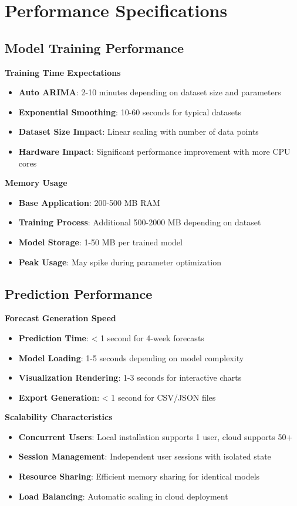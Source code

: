 \section{Performance Specifications}

\subsection{Model Training Performance}

\textbf{Training Time Expectations}
\begin{itemize}
	\item \textbf{Auto ARIMA}: 2-10 minutes depending on dataset size and parameters
	\item \textbf{Exponential Smoothing}: 10-60 seconds for typical datasets
	\item \textbf{Dataset Size Impact}: Linear scaling with number of data points
	\item \textbf{Hardware Impact}: Significant performance improvement with more CPU cores
\end{itemize}

\textbf{Memory Usage}
\begin{itemize}
	\item \textbf{Base Application}: 200-500 MB RAM
	\item \textbf{Training Process}: Additional 500-2000 MB depending on dataset
	\item \textbf{Model Storage}: 1-50 MB per trained model
	\item \textbf{Peak Usage}: May spike during parameter optimization
\end{itemize}

\subsection{Prediction Performance}

\textbf{Forecast Generation Speed}
\begin{itemize}
	\item \textbf{Prediction Time}: < 1 second for 4-week forecasts
	\item \textbf{Model Loading}: 1-5 seconds depending on model complexity
	\item \textbf{Visualization Rendering}: 1-3 seconds for interactive charts
	\item \textbf{Export Generation}: < 1 second for CSV/JSON files
\end{itemize}

\textbf{Scalability Characteristics}
\begin{itemize}
	\item \textbf{Concurrent Users}: Local installation supports 1 user, cloud supports 50+
	\item \textbf{Session Management}: Independent user sessions with isolated state
	\item \textbf{Resource Sharing}: Efficient memory sharing for identical models
	\item \textbf{Load Balancing}: Automatic scaling in cloud deployment
\end{itemize}

